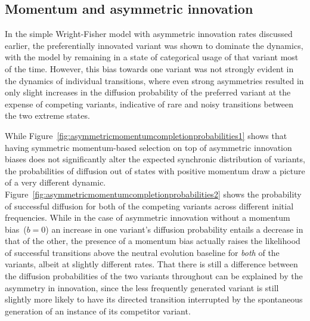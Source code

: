 \subsection{Momentum and asymmetric innovation}

In the simple Wright-Fisher model with asymmetric innovation rates discussed earlier, the preferentially innovated variant was shown to dominate the dynamics, with the model by remaining in a state of categorical usage of that variant most of the time.
However, this bias towards one variant was not strongly evident in the dynamics of individual transitions, where even strong asymmetries resulted in only slight increases in the diffusion probability of the preferred variant at the expense of competing variants, indicative of rare and noisy transitions between the two extreme states.

While Figure~\ref{fig:asymmetricmomentumcompletionprobabilities1} shows that having symmetric momentum-based selection on top of asymmetric innovation biases does not significantly alter the expected synchronic distribution of variants, the probabilities of diffusion out of states with positive momentum draw a picture of a very different dynamic.
Figure~\ref{fig:asymmetricmomentumcompletionprobabilities2} shows the probability of successful diffusion for both of the competing variants across different initial frequencies. While in the case of asymmetric innovation without a momentum bias~($b=0$) an increase in one variant's diffusion probability entails a decrease in that of the other, the presence of a momentum bias actually raises the likelihood of successful transitions above the neutral evolution baseline for \emph{both} of the variants, albeit at slightly different rates.
That there is still a difference between the diffusion probabilities of the two variants throughout can be explained by the asymmetry in innovation, since the less frequently generated variant is still slightly more likely to have its directed transition interrupted by the spontaneous generation of an instance of its competitor variant.

